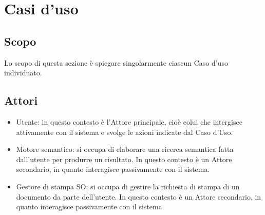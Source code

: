 \documentclass[a4paper,12pt]{article}
\begin{document}
    \section{Casi d'uso} {
        \subsection{Scopo} {
            Lo scopo di questa sezione è spiegare singolarmente ciascun Caso d'uso individuato.  
        }
        \subsection{Attori} {
            \begin{itemize}
                \item Utente: in questo contesto è l'Attore principale, cioè colui che intergisce attivamente con il sistema e svolge le azioni indicate dal Caso d'Uso.
                \item Motore semantico: si occupa di elaborare una ricerca semantica fatta dall'utente per produrre un risultato. In questo contesto è un Attore secondario, in quanto interagisce passivamente con il sistema.
                \item Gestore di stampa SO: si occupa di gestire la richiesta di stampa di un documento da parte dell'utente. In questo contesto è un Attore secondario, in quanto interagisce passivamente con il sistema.
            \end{itemize}
        }
}
\end{document}
